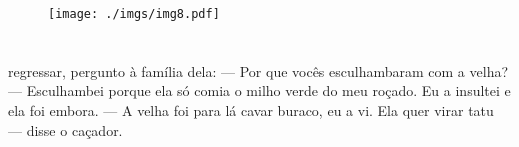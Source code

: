 \vspace*{\fill}

\pagebreak
\thispagestyle{empty}
\begin{figure}
\vspace*{-2cm}
\hspace*{-2.5cm}\texttt{[image: ./imgs/img8.pdf]}
\end{figure}

\chapter*{}

\mbox{}\vspace*{\fill}



 regressar, pergunto
à família dela:\break
--- Por que vocês
esculhambaram com a velha?\break
--- Esculhambei porque ela só
comia o milho verde do meu
roçado. Eu a insultei e
ela foi embora.\break
--- A velha foi para lá cavar
buraco, eu a vi. Ela quer virar
tatu — disse o caçador.

